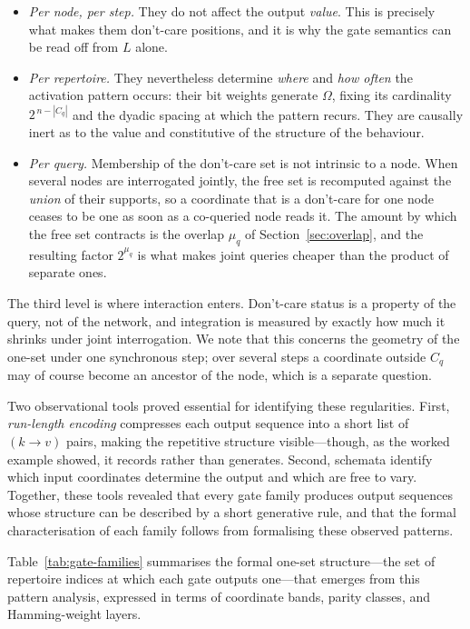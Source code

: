\documentclass[11pt]{article}
\begin{document}
\begin{itemize}[leftmargin=1.4em]
\item \emph{Per node, per step.} They do not affect the output \emph{value}.
  This is precisely what makes them don't-care positions, and it is why the
  gate semantics can be read off from $L$ alone.
\item \emph{Per repertoire.} They nevertheless determine \emph{where} and
  \emph{how often} the activation pattern occurs: their bit weights generate
  $\Omega$, fixing its cardinality $2^{\,n-|C_q|}$ and the dyadic spacing at
  which the pattern recurs.  They are causally inert as to the value and
  constitutive of the structure of the behaviour.
\item \emph{Per query.} Membership of the don't-care set is not intrinsic to
  a node.  When several nodes are interrogated jointly, the free set is
  recomputed against the \emph{union} of their supports, so a coordinate that
  is a don't-care for one node ceases to be one as soon as a co-queried node
  reads it.  The amount by which the free set contracts is the overlap
  $\mu_q$ of Section~\ref{sec:overlap}, and the resulting factor $2^{\mu_q}$
  is what makes joint queries cheaper than the product of separate ones.
\end{itemize}

\noindent
The third level is where interaction enters.  Don't-care status is a property
of the query, not of the network, and integration is measured by exactly how
much it shrinks under joint interrogation.  We note that this concerns the
geometry of the one-set under one synchronous step; over several steps a
coordinate outside $C_q$ may of course become an ancestor of the node, which
is a separate question.

Two observational tools proved essential for identifying these
regularities.  First, \emph{run-length encoding} compresses each output
sequence into a short list of $(k \!\to\! v)$ pairs, making the
repetitive structure visible---though, as the worked example showed, it
records rather than generates.  Second, schemata identify which input
coordinates determine the output and which are free to vary.  Together,
these tools revealed that every gate family produces output sequences whose
structure can be described by a short generative rule, and that the formal
characterisation of each family follows from formalising these observed
patterns.

Table~\ref{tab:gate-families} summarises the formal one-set
structure---the set of repertoire indices at which each gate outputs
one---that emerges from this pattern analysis, expressed in terms of
coordinate bands, parity classes, and Hamming-weight layers.
\end{document}
